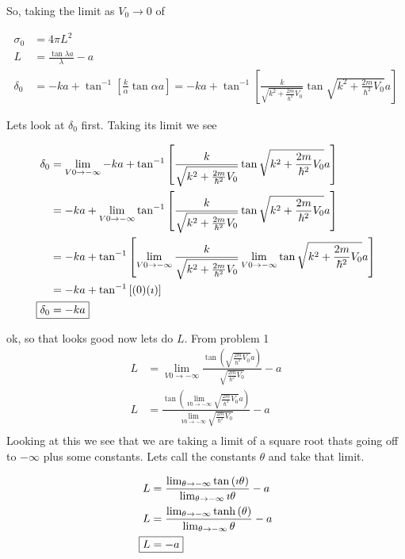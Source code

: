 \documentclass{jhwhw}
\begin{document}
So, taking the limit as $V_0 \to 0$ of

\begin{align}
    \sigma_0 &= 4\pi L^2 \\
    L &= \frac {\tan{\lambda a}}{\lambda} - a \\
    \delta_0 &= -ka +\tan^{-1}\left[\frac{k}{\alpha} \tan{\alpha a} \right] = -ka +\tan^{-1}\left[\frac{k}{\sqrt{k^2 + \frac{2 m}{\hbar^2}V_0}} \tan{\sqrt{k^2 + \frac{2 m}{\hbar^2}V_0} a} \right]
\end{align}

Lets look at $\delta_0$ first.  Taking its limit we see

\begin{align}
   \delta_0 &=\lim_{V0 \to -\infty} -ka +\tan^{-1}\left[\frac{k}{\sqrt{k^2 + \frac{2 m}{\hbar^2}V_0}} \tan{\sqrt{k^2 + \frac{2 m}{\hbar^2}V_0} a} \right] \\
    &= -ka + \lim_{V0 \to -\infty} \tan^{-1}\left[\frac{k}{\sqrt{k^2 + \frac{2 m}{\hbar^2}V_0}} \tan{\sqrt{k^2 + \frac{2 m}{\hbar^2}V_0} a} \right] \\
    &= -ka +\tan^{-1}\left[\lim_{V0 \to -\infty} \frac{k}{\sqrt{k^2 + \frac{2 m}{\hbar^2}V_0}} \lim_{V0 \to -\infty}\tan{\sqrt{k^2 + \frac{2 m}{\hbar^2}V_0} a} \right] \\
    &= -ka +\tan^{-1}\left[(0) (\imath) \right] \\
    \Aboxed{\delta_0 &= -ka}
\end{align}

ok, so that looks good now lets do $L$.  From problem 1
\begin{align}
    L &= \lim_{V0 \to -\infty} \frac {\tan{\left(\sqrt{\frac{2 m}{\hbar^2}V_0} a\right)}}{\sqrt{\frac{2 m}{\hbar^2}V_0}} - a \\
    L &= \frac {\tan{\left(\lim_{V0 \to -\infty} \sqrt{\frac{2 m}{\hbar^2}V_0} a\right)}}{\lim_{V0 \to -\infty}\sqrt{\frac{2 m}{\hbar^2}V_0}} - a \\
\end{align}
Looking at this we see that we are taking a limit of a square root thats going off to $-\infty$ plus some constants.  Lets call the constants $\theta$ and take that limit.

\begin{align}
    L &= \frac {\lim_{\theta \to -\infty}\tan{\left( \imath \theta \right)}}{\lim_{\theta \to -\infty}\imath \theta} - a \\
    L &= \frac {\lim_{\theta \to -\infty}\tanh{\left( \theta \right)}}{\lim_{\theta \to -\infty} \theta} - a \\
    \Aboxed{L &= - a} 
\end{align}
\end{document}
